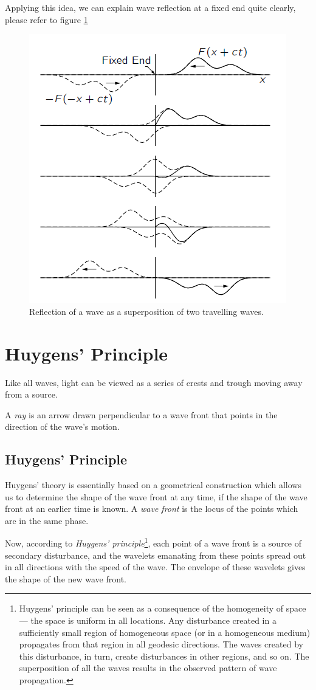 \documentclass[UTF8]{book}
\begin{document}
Applying this idea, we can explain wave reflection at a fixed end quite clearly, please refer to figure \ref{fig:6}
\begin{figure}[H]
\centering
\includegraphics[scale=1]{Figure/6.PNG}
\caption{Reflection of a wave as a superposition of two travelling waves.}
\label{fig:6}
\end{figure}



\section{Huygens' Principle}
Like all waves, light can be viewed as a series of crests and trough moving away from a source.

A \emph{ray} is an arrow drawn perpendicular to a wave front that points in the direction of the wave’s motion.


\subsection{Huygens' Principle}
Huygens' theory is essentially based on a geometrical construction which allows us to determine the shape of the wave front at any time, if the shape of the wave front at an earlier time is known. A \emph{wave front} is the locus of the points which are in the same phase.

Now, according to \emph{Huygens' principle}\footnote{Huygens' principle can be seen as a consequence of the homogeneity of space — the space is uniform in all locations. Any disturbance created in a sufficiently small region of homogeneous space (or in a homogeneous medium) propagates from that region in all geodesic directions. The waves created by this disturbance, in turn, create disturbances in other regions, and so on. The superposition of all the waves results in the observed pattern of wave propagation.}, each point of a wave front is a source of secondary disturbance, and the wavelets emanating from these points spread out in all directions with the speed of the wave. The envelope of these wavelets gives the shape of the new wave front.
\end{document}
